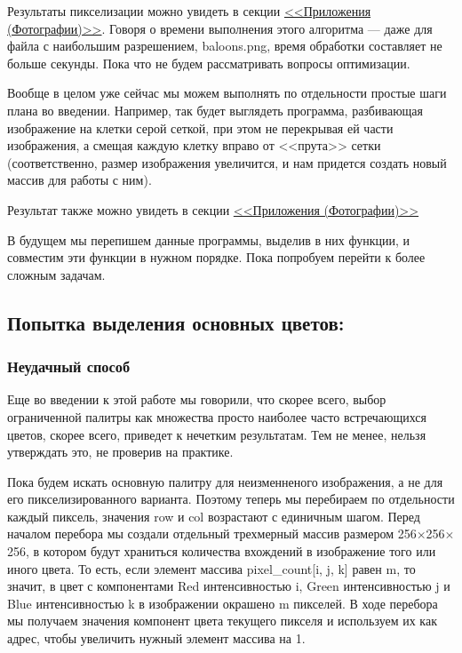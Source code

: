 \documentclass[12pt]{article}
\begin{document}
{	Результаты пикселизации можно увидеть в секции \hyperref[pixel_cats]{<<Приложения (Фотографии)>>}. Говоря о времени выполнения этого алгоритма --- даже для файла с наибольшим разрешением, baloons.png, время обработки составляет не больше секунды. Пока что не будем рассматривать вопросы оптимизации.
	
	Вообще в целом уже сейчас мы можем выполнять по отдельности простые шаги плана во введении. Например, так будет выглядеть программа, разбивающая изображение на клетки серой сеткой, при этом не перекрывая ей части изображения, а смещая каждую клетку вправо от <<прута>> сетки (соответственно, размер изображения увеличится, и нам придется создать новый массив для работы с ним).
	
	
	
	Результат также можно увидеть в секции \hyperref[gridded_cats]{<<Приложения (Фотографии)>>}
	
	В будущем мы перепишем данные программы, выделив в них функции, и совместим эти функции в нужном порядке. Пока попробуем перейти к более сложным задачам.
	
	\subsection{Попытка выделения основных цветов:}
	
	\subsubsection{Неудачный способ}
	Еще во введении к этой работе мы говорили, что скорее всего, выбор ограниченной палитры как множества просто наиболее часто встречающихся цветов, скорее всего, приведет к нечетким результатам. Тем не менее, нельзя утверждать это, не проверив на практике.
	
	
	
	Пока будем искать основную палитру для неизменненого изображения, а не для его пикселизированного варианта. Поэтому теперь мы перебираем по отдельности каждый пиксель, значения row и col возрастают с единичным шагом. Перед началом перебора мы создали отдельный трехмерный массив размером 256$\times$256$\times$256, в котором будут храниться количества вхождений в изображение того или иного цвета. То есть, если элемент массива pixel\_count[i, j, k] равен m, то значит, в цвет с компонентами Red интенсивностью i, Green интенсивностью j и Blue интенсивностью k в изображении окрашено m пикселей. В ходе перебора мы получаем значения компонент цвета текущего пикселя и используем их как адрес, чтобы увеличить нужный элемент массива на 1.
	
}
\end{document}

